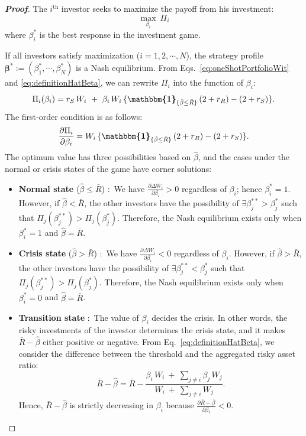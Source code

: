 \documentclass[11pt,a4paper]{article}
\begin{document}
\begin{proof}[\textbf{Proof}]
	The $i^\text{th}$ investor seeks to maximize the payoff from his investment:
	\[
		\max_{\beta_{i}}\ \Pi_{i}
	\]
	where $\beta_{i}^\ast$ is the best response in the investment game.
	
	If all investors satisfy maximization ($i=1,2,\cdots,N$), the strategy profile $\boldsymbol{\beta}^\ast:=(\beta_{1}^\ast,\cdots,\beta_{N}^\ast)$ is a Nash equilibrium. 
	From Eqs.~\eqref{eq:oneShotPortfolioWit} and \eqref{eq:definitionHatBeta}, we can rewrite $\Pi_{i}$ into the function of $\beta_{i}$:
	\begin{equation}%
		\Pi_{i}(\beta_{i}) = r_{S}\, W_i\ +\ \beta_{i}\, W_{i}\, \{\boldsymbol{\mathbbm{1}}_{\{\hat{\beta} \leq \bar{R}\}}\, (2+r_{R})-(2+r_{S})\}.\notag
	\end{equation}
	The first-order condition is as follows:
	\begin{equation}
		\label{eq:WiBetaPartial}
		\frac{\partial\Pi_{i}}{\partial\beta_{i}} = W_{i}\, \{\boldsymbol{\mathbbm{1}}_{\{\hat{\beta} \leq \bar{R}\}}\, (2+r_{R})-(2+r_{S})\}.
	\end{equation}
	The optimum value has three possibilities based on $\hat{\beta}$, and the cases under the normal or crisis states of the game have corner solutions:
	\begin{itemize}
		\item[(1)] \textbf{Normal state} ($\hat{\beta} \leq \bar{R}$) :\ We have $\frac{\partial\Delta W_{i}}{\partial\beta_{i}}>0$ regardless of $\beta_{i}$; hence $\beta_{i}^\ast=1$. However, if $\hat{\beta} < \bar{R}$, the other investors have the possibility of $\exists \beta_{j}^{\ast\ast}>\beta_{j}^\ast$ such that $\Pi_{j} (\beta_{j}^{\ast\ast})>\Pi_{j} (\beta_{j}^\ast)$. Therefore, the Nash equilibrium exists only when $\beta_{i}^\ast=1$ and $\hat{\beta}=\bar{R}$.
		\item[(2)] \textbf{Crisis state} ($\hat{\beta} > \bar{R}$) :\ We have $\frac{\partial\Delta W_{i}}{\partial\beta_{i}}<0$ regardless of $\beta_{i}$. However, if $\hat{\beta} > \bar{R}$, the other investors have the possibility of $\exists \beta_{j}^{\ast\ast}<\beta_{j}^\ast$ such that $\Pi_{j} (\beta_{j}^{\ast\ast})>\Pi_{j}(\beta_{j}^\ast)$. Therefore, the Nash equilibrium exists only when $\beta_{i}^\ast=0$ and $\hat\beta=\bar R$. 
		\item[(3)] \textbf{Transition state} :\ The value of $\beta_{i}$ decides the crisis. In other words, the risky investments of the investor determines the crisis state, and it makes $\bar{R} - \hat{\beta}$ either positive or negative. From Eq.~\eqref{eq:definitionHatBeta}, we consider the difference between the threshold and the aggregated risky asset ratio:
		\[
			\bar{R} - \hat{\beta} = \bar{R} - \frac{\beta_{i}\, W_{i}\ +\ \sum_{j\neq i}\beta_{j}\, W_{j}}{W_{i}\ +\ \sum_{j\neq i}W_{j}}.
		\]
		Hence, $\bar{R} - \hat{\beta}$ is strictly decreasing in $\beta_{i}$ because $\frac{\partial\bar{R} - \hat{\beta}}{\partial \beta_{i}}<0$. 
		

\end{itemize}
\end{proof}
\end{document}
